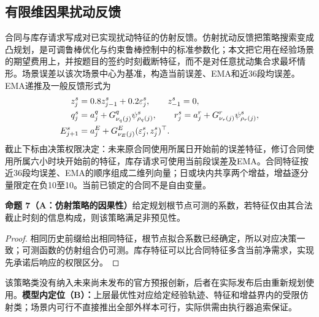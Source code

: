\documentclass[UTF8,a4paper,zihao=-4,fontset=mac]{ctexart}
\newcommand{\pp}[2]{\par\noindent\textbf{命题 #1（#2）}\quad}
\begin{document}
\subsection{有限维因果扰动反馈}
合同与库存请求写成对已实现扰动特征的仿射反馈。仿射扰动反馈把策略搜索变成凸规划，是可调鲁棒优化与约束鲁棒控制中的标准参数化\cite{bental2004,goulart2006}；本文把它用在经验场景的期望费用上，并按题目的签约时刻截断特征，而不是对任意扰动集合求最坏情形。场景误差以该次场景中心为基准，构造当前误差、EMA和近36段均误差。EMA递推及一般反馈形式为
\begin{align}
 z_j^s&=0.8z_{j-1}^s+0.2\varepsilon_j^s,\qquad z_{-1}^s=0,\label{eq:ema}\\
 q_j^s&=a_j^q+G_{\nu_q(j)}^q\psi_{\rho_q(j)}^s,\qquad
 r_j^s=a_j^r+G_{\nu_r(j)}^r\psi_{\rho_r(j)}^s,\label{eq:affine}\\
 E_{j+1}^s&=a_j^E+G_{\nu_E(j)}^E(\varepsilon_j^s,z_j^s)^\top.\notag
\end{align}
截止下标由决策权限决定：未来原合同使用所属日开始前的误差特征，修订合同使用所属六小时块开始前的特征，库存请求可使用当前段误差及EMA。合同特征按近36段均误差、EMA的顺序组成二维列向量；日或块内共享两个增益，增益逐分量限定在负10至10。当前已锁定的合同不是自由变量。

\pp{7}{A：仿射策略的因果性}给定规划根节点可测的系数，若特征仅由其合法截止时刻的信息构成，则该策略满足非预见性。
\begin{proof}
相同历史前缀给出相同特征，根节点拟合系数已经确定，所以对应决策一致；可测函数的仿射组合仍可测。库存特征可以比合同特征多含当前净需求，实现先承诺后响应的权限区分。
\end{proof}
该策略类没有纳入未来尚未发布的官方预报创新，后者在实际发布后由重新规划使用。\textbf{模型内定位（B）：}上层最优性对应给定经验轨迹、特征和增益界内的受限仿射类；场景内可行不直接推出全部外样本可行，实际供需由执行器追索保证。
\end{document}
